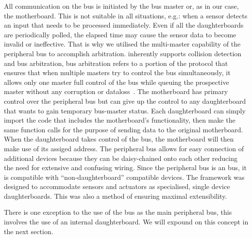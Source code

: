 	All communication on the \iic bus is initiated by the bus master or, as in our case, the motherboard. This is not suitable in all situations, e.g.: when a sensor detects an input that needs to be processed immediately. Even if all the daughterboards are periodically polled, the elapsed time may cause the sensor data to become invalid or ineffective. That is why we utilised the multi-master capability of the \iic peripheral bus to accomplish arbitration. \iic inherently supports collision detection and bus arbitration, bus arbitration refers to a portion of the protocol that ensures that when multiple masters try to control the bus simultaneously, it allows only one master full control of the bus while queuing the prospective master without any corruption or dataloss~\parencite{nxpi2c}. The motherboard has primary control over the peripheral bus but can give up the control to any daughterboard that wants to gain temporary bus-master status. Each daughterboard can simply import the code that includes the motherboard's functionality, then make the same function calls for the purpose of sending data to the original motherboard. When the daughterboard takes control of the bus, the motherboard will then make use of its assiged \iic address.
	The peripheral bus allows for easy connection of additional devices because they can be daisy-chained onto each other reducing the need for extensive and confusing wiring. Since the peripheral bus is an \iic bus, it is compatible with ``non-daughterboard'' \iic compatible devices. The framework was designed to accommodate sensors and actuators as specialised, single device daughterboards. This was also a method of ensuring maximal extensibility.
	
	There is one exception to the use of the \iic bus as the main peripheral bus, this involves the use of an internal daughterboard. We will expound on this concept in the next section.
	
